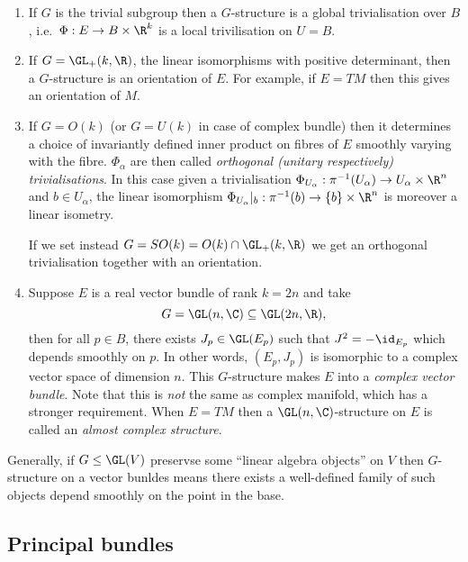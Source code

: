 \documentclass[a4paper]{article}
\begin{document}
\begin{eg}\leavevmode
  \begin{enumerate}
  \item If \(G\) is the trivial subgroup then a \(G\)-structure is a global trivialisation over \(B\), i.e.\ \(\Phi: E \to B \times \R^k\) is a local trivilisation on \(U = B\).
  \item If \(G = \GL_+(k, \R)\), the linear isomorphisms with positive determinant, then a \(G\)-structure is an orientation of \(E\). For example, if \(E = TM\) then this gives an orientation of \(M\).
  \item If \(G = O(k)\) (or \(G = U(k)\) in case of complex bundle) then it determines a choice of invariantly defined inner product on fibres of \(E\) smoothly varying with the fibre. \(\Phi_\alpha\) are then called \emph{orthogonal (unitary respectively) trivialisations}. In this case given a trivialisation \(\Phi_{U_\alpha}: \pi^{-1}(U_\alpha) \to U_\alpha \times \R^n\) and \(b \in U_\alpha\), the linear isomorphism \(\Phi_{U_\alpha}|_b: \pi^{-1}(b) \to \{b\} \times \R^n\) is moreover a linear isometry.

    If we set instead \(G = SO(k) = O(k) \cap \GL_+(k, \R)\) we get an orthogonal trivialisation together with an orientation.
  \item Suppose \(E\) is a real vector bundle of rank \(k = 2n\) and take
    \[
      G = \GL(n, \C) \subseteq \GL(2n, \R),
    \]
    then for all \(p \in B\), there exists \(J_p \in \GL(E_p)\) such that \(J^2 = -\id_{E_p}\) which depends smoothly on \(p\). In other words, \((E_p, J_p)\) is isomorphic to a complex vector space of dimension \(n\). This \(G\)-structure makes \(E\) into a \emph{complex vector bundle}. Note that this is \emph{not} the same as complex manifold, which has a stronger requirement. When \(E = TM\) then a \(\GL(n, \C)\)-structure on \(E\) is called an \emph{almost complex structure}.
  \end{enumerate}
\end{eg}

Generally, if \(G \leq \GL(V)\) preservse some ``linear algebra objects'' on \(V\) then \(G\)-structure on a vector bunldes means there exists a well-defined family of such objects depend smoothly on the point in the base.

\subsection{Principal bundles}
\end{document}
